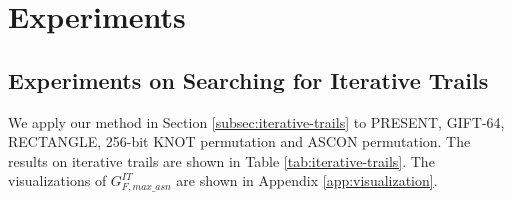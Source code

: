 \section{Experiments\label{sec:experiment}}

\subsection{Experiments on Searching for Iterative Trails}

We apply our method in Section \ref{subsec:iterative-trails} to PRESENT, GIFT-64, RECTANGLE, 256-bit KNOT permutation and ASCON permutation. The results on iterative trails are shown in Table \ref{tab:iterative-trails}. The visualizations of $G^{IT}_{F,max\_asn}$ are shown in Appendix \ref{app:visualization}.


